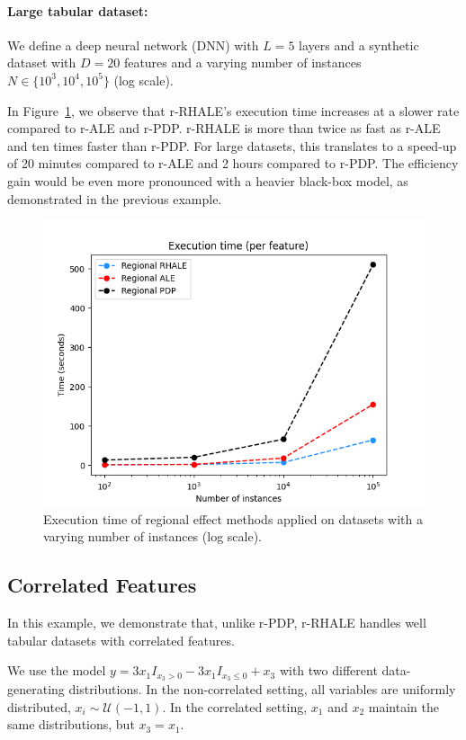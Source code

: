 \documentclass[
twocolumn,
]{ceurart}
\begin{document}
\paragraph{Large tabular dataset:}

We define a deep neural network (DNN) with \( L = 5 \) layers and a synthetic dataset with \( D = 20 \) features and a varying number of instances \( N \in \{10^3, 10^4, 10^5\} \) (log scale).

In Figure~\ref{fig:efficiency_nof_instances}, we observe that r-RHALE's execution time increases at a slower rate compared to r-ALE and r-PDP. r-RHALE is more than twice as fast as r-ALE and ten times faster than r-PDP. For large datasets, this translates to a speed-up of 20 minutes compared to r-ALE and 2 hours compared to r-PDP. The efficiency gain would be even more pronounced with a heavier black-box model, as demonstrated in the previous example.

\begin{figure}
    \centering
    \includegraphics[width=.49\textwidth]{figures/simulation_2/efficiency_samples.png}
    \caption{Execution time of regional effect methods applied on datasets with a varying number of instances (log scale).}
    \label{fig:efficiency_nof_instances}
\end{figure}


\subsection{Correlated Features}
\label{sec:correlated-features}

In this example, we demonstrate that, unlike r-PDP, r-RHALE handles well tabular datasets with correlated features.

We use the model \( y = 3x_1I_{x_3 > 0} - 3x_1I_{x_3 \leq 0} + x_3 \) with two different data-generating distributions. In the non-correlated setting, all variables are uniformly distributed, \( x_i \sim \mathcal{U}(-1,1) \). In the correlated setting, \( x_1 \) and \( x_2 \) maintain the same distributions, but \( x_3 = x_1 \).
\end{document}
